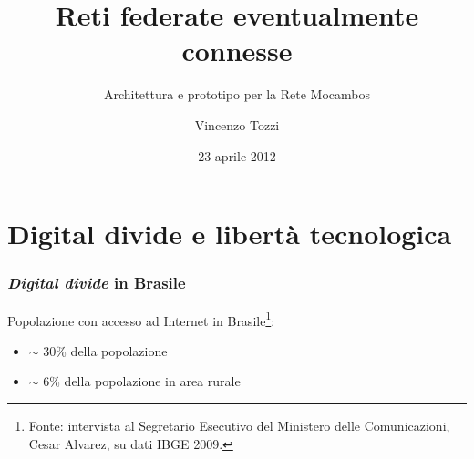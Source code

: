 \documentclass{beamer}
\title{Reti federate eventualmente connesse}
\subtitle{Architettura e prototipo per la Rete Mocambos}
\author{Vincenzo Tozzi}
\institute{Universit\`a degli Studi di Firenze - Corso di Laurea in Informatica}
\date{23 aprile 2012}
\begin{document}
{
%
\begin{frame}
  \titlepage
\end{frame}
}


\section{Digital divide e libertà tecnologica}

\begin{frame}

  \frametitle{\emph{Digital divide} in Brasile}
  Popolazione con accesso ad Internet in Brasile\footnote{Fonte: intervista al Segretario Esecutivo del Ministero delle
    Comunicazioni, Cesar Alvarez, su dati IBGE 2009.}:
  \begin{itemize}
    \item $\sim$ 30\% della popolazione
    \item $\sim$ 6\% della popolazione in area rurale  
  \end{itemize}
    
\end{frame}
\end{document}

